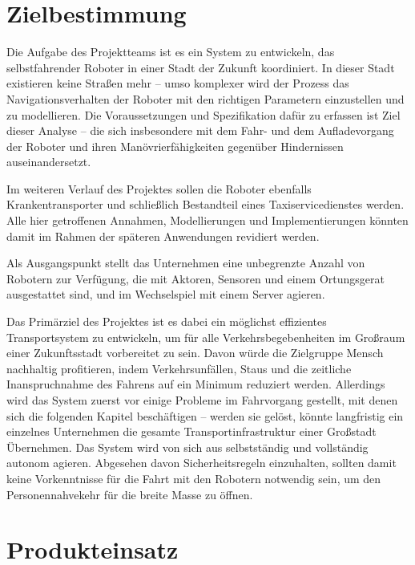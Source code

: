 \documentclass[includeheaders]{scrartcl}
\begin{document}
	\vspace{2cm}

	\tableofcontents

	\newpage

	\section{Zielbestimmung}
	Die Aufgabe des Projektteams ist es ein System zu entwickeln, das selbstfahrender Roboter in einer Stadt der Zukunft koordiniert. In dieser Stadt existieren keine Straßen mehr – umso komplexer wird der Prozess das Navigationsverhalten der Roboter mit den richtigen Parametern einzustellen und zu modellieren. Die Voraussetzungen und Spezifikation dafür zu erfassen ist Ziel dieser Analyse – die sich insbesondere mit dem Fahr- und dem Aufladevorgang der Roboter und ihren Manövrierfähigkeiten gegenüber Hindernissen auseinandersetzt.

	Im weiteren Verlauf des Projektes sollen die Roboter ebenfalls Krankentransporter und schließlich Bestandteil eines Taxiservicedienstes werden. Alle hier getroffenen Annahmen, Modellierungen und Implementierungen könnten damit im Rahmen der späteren Anwendungen revidiert werden.

	Als Ausgangspunkt stellt das Unternehmen eine unbegrenzte Anzahl von Robotern zur Verfügung, die mit Aktoren, Sensoren und einem Ortungsgerat ausgestattet sind, und im Wechselspiel mit einem Server agieren.

	Das Primärziel des Projektes ist es dabei ein möglichst effizientes Transportsystem zu entwickeln, um für alle Verkehrsbegebenheiten im Großraum einer Zukunftsstadt vorbereitet zu sein. Davon würde die Zielgruppe Mensch nachhaltig profitieren, indem Verkehrsunfällen, Staus und die zeitliche Inanspruchnahme des Fahrens auf ein Minimum reduziert werden. Allerdings wird das System zuerst vor einige Probleme im Fahrvorgang gestellt, mit denen sich die folgenden Kapitel beschäftigen – werden sie gelöst, könnte langfristig ein einzelnes Unternehmen die gesamte Transportinfrastruktur einer Großstadt Übernehmen. Das System wird von sich aus selbstständig und vollständig autonom agieren. Abgesehen davon Sicherheitsregeln einzuhalten, sollten damit keine Vorkenntnisse für die Fahrt mit den Robotern notwendig sein, um den Personennahvekehr für die breite Masse zu öffnen.

	\pagebreak

	\section{Produkteinsatz}
\end{document}
